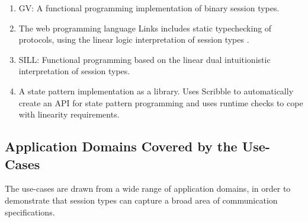 \begin{enumerate}
	\item	GV:			A functional programming implementation of binary session types. 
	\item	The web programming language Links \cite{} includes static typechecking of protocols, using the linear logic interpretation of session types \cite{}. 
	\item	SILL:		Functional programming based on the linear dual intuitionistic interpretation of session types. 

	\item	A state pattern implementation as a library. Uses Scribble to automatically
			create an API for state pattern programming and uses runtime checks to
			cope with linearity requirements.

\end{enumerate}

\subsection{Application Domains Covered by the Use-Cases}

The use-cases are drawn from a wide range of
application domains, in order to demonstrate that
session types can capture
a broad area of communication specifications. 


